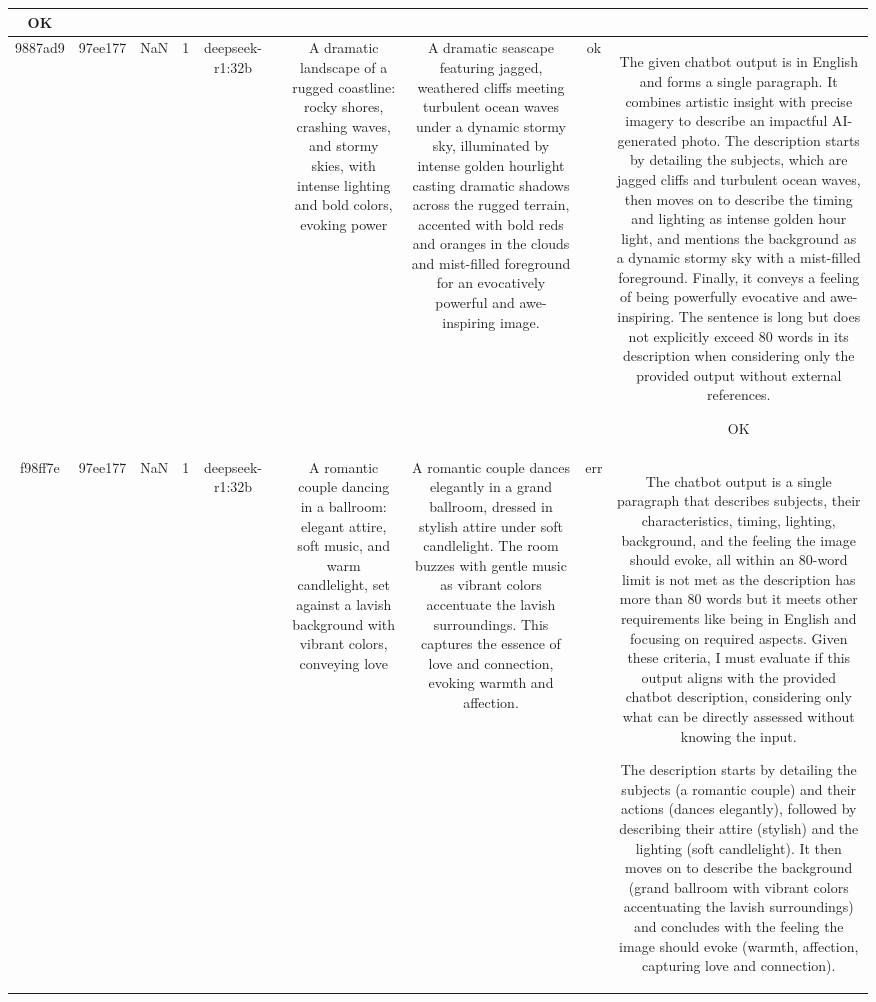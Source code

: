 \begin{table}[h!]
\begin{tabular}{|c|c|c|c|c|c|c|c|c|c|}
OK\\
\hline
9887ad9 & 97ee177 & NaN & 1 & deepseek-r1:32b &  & A dramatic landscape of a rugged coastline: rocky shores, crashing waves, and stormy skies, with intense lighting and bold colors, evoking power & A dramatic seascape featuring jagged, weathered cliffs meeting turbulent ocean waves under a dynamic stormy sky, illuminated by intense golden hourlight casting dramatic shadows across the rugged terrain, accented with bold reds and oranges in the clouds and mist-filled foreground for an evocatively powerful and awe-inspiring image. & ok & The given chatbot output is in English and forms a single paragraph. It combines artistic insight with precise imagery to describe an impactful AI-generated photo. The description starts by detailing the subjects, which are jagged cliffs and turbulent ocean waves, then moves on to describe the timing and lighting as intense golden hour light, and mentions the background as a dynamic stormy sky with a mist-filled foreground. Finally, it conveys a feeling of being powerfully evocative and awe-inspiring. The sentence is long but does not explicitly exceed 80 words in its description when considering only the provided output without external references.

OK\\
\hline
f98ff7e & 97ee177 & NaN & 1 & deepseek-r1:32b &  & A romantic couple dancing in a ballroom: elegant attire, soft music, and warm candlelight, set against a lavish background with vibrant colors, conveying love & A romantic couple dances elegantly in a grand ballroom, dressed in stylish attire under soft candlelight. The room buzzes with gentle music as vibrant colors accentuate the lavish surroundings. This captures the essence of love and connection, evoking warmth and affection. & err & The chatbot output is a single paragraph that describes subjects, their characteristics, timing, lighting, background, and the feeling the image should evoke, all within an 80-word limit is not met as the description has more than 80 words but it meets other requirements like being in English and focusing on required aspects. Given these criteria, I must evaluate if this output aligns with the provided chatbot description, considering only what can be directly assessed without knowing the input.

The description starts by detailing the subjects (a romantic couple) and their actions (dances elegantly), followed by describing their attire (stylish) and the lighting (soft candlelight). It then moves on to describe the background (grand ballroom with vibrant colors accentuating the lavish surroundings) and concludes with the feeling the image should evoke (warmth, affection, capturing love and connection). 


\end{tabular}
\end{table}
